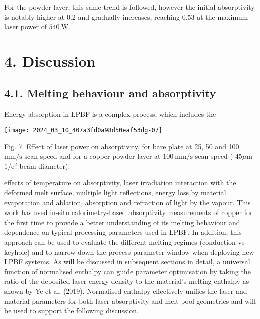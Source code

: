 \documentclass[10pt]{article}
\begin{document}
For the powder layer, this same trend is followed, however the initial absorptivity is notably higher at 0.2 and gradually increases, reaching 0.53 at the maximum laser power of $540 \mathrm{~W}$.

\section*{4. Discussion}
\subsection*{4.1. Melting behaviour and absorptivity}
Energy absorption in LPBF is a complex process, which includes the

\begin{center}
\texttt{[image: 2024\_03\_10\_407a3fd0a98d50eaf53dg-07]}
\end{center}

Fig. 7. Effect of laser power on absorptivity, for bare plate at 25, 50 and 100 $\mathrm{mm} / \mathrm{s}$ scan speed and for a copper powder layer at $100 \mathrm{~mm} / \mathrm{s}$ scan speed ( $45 \mu \mathrm{m}$ $1 / \mathrm{e}^{2}$ beam diameter).

effects of temperature on absorptivity, laser irradiation interaction with the deformed melt surface, multiple light reflections, energy loss by material evaporation and ablation, absorption and refraction of light by the vapour. This work has used in-situ calorimetry-based absorptivity measurements of copper for the first time to provide a better understanding of its melting behaviour and dependence on typical processing parameters used in LPBF. In addition, this approach can be used to evaluate the different melting regimes (conduction vs keyhole) and to narrow down the process parameter window when deploying new LPBF systems. As will be discussed in subsequent sections in detail, a universal\\
function of normalised enthalpy can guide parameter optimisation by taking the ratio of the deposited laser energy density to the material's melting enthalpy as shown by Ye et al. (2019). Normalised enthalpy effectively unifies the laser and material parameters for both laser absorptivity and melt pool geometries and will be used to support the following discussion.
\end{document}
